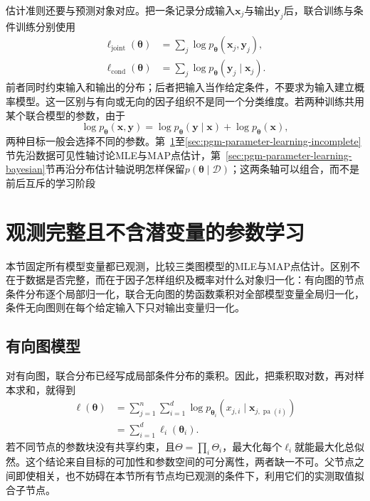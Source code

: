 估计准则还要与预测对象对应。把一条记录分成输入$\bm{x}_j$与输出$\bm{y}_j$后，联合训练与条件训练分别使用
\[
  \begin{aligned}
    \ell_{\mathrm{joint}}(\bm{\theta})
      &=\sum_j\log p_{\bm{\theta}}(\bm{x}_j,\bm{y}_j),\\
    \ell_{\mathrm{cond}}(\bm{\theta})
      &=\sum_j\log p_{\bm{\theta}}(\bm{y}_j\mid\bm{x}_j).
  \end{aligned}
\]
前者同时约束输入和输出的分布；后者把输入当作给定条件，不要求为输入建立概率模型。这一区别与有向或无向的因子组织不是同一个分类维度。若两种训练共用某个联合模型的参数，由于
\[
  \log p_{\bm{\theta}}(\bm{x},\bm{y})
  =\log p_{\bm{\theta}}(\bm{y}\mid\bm{x})
   +\log p_{\bm{\theta}}(\bm{x}),
\]
两种目标一般会选择不同的参数。第~\ref{sec:pgm-parameter-learning-complete}至\ref{sec:pgm-parameter-learning-incomplete}节先沿数据可见性轴讨论MLE与MAP点估计，第~\ref{sec:pgm-parameter-learning-bayesian}节再沿分布估计轴说明怎样保留$p(\bm{\theta}\mid\mathcal{D})$；这两条轴可以组合，而不是前后互斥的学习阶段

\section{观测完整且不含潜变量的参数学习}
\label{sec:pgm-parameter-learning-complete}

本节固定所有模型变量都已观测，比较三类图模型的MLE与MAP点估计。区别不在于数据是否完整，而在于因子怎样组织及概率对什么对象归一化：有向图的节点条件分布逐个局部归一化，联合无向图的势函数乘积对全部模型变量全局归一化，条件无向图则在每个给定输入下只对输出变量归一化。

\subsection{有向图模型}
\label{sec:pgm-parameter-learning-directed}

对有向图，联合分布已经写成局部条件分布的乘积。因此，把乘积取对数，再对样本求和，就得到
\begin{equation}
  \begin{aligned}
    \ell(\bm{\theta})
      &=\sum_{j=1}^n\sum_{i=1}^d
        \log p_{\bm{\theta}_i}
        (x_{j,i}\mid\bm{x}_{j,\operatorname{pa}(i)})\\
      &=\sum_{i=1}^d\ell_i(\bm{\theta}_i).
  \end{aligned}
  \label{eq:pgm-parameter-learning-dag-likelihood}
\end{equation}
若不同节点的参数块没有共享约束，且$\Theta=\prod_i\Theta_i$，最大化每个$\ell_i$就能最大化总似然。这个结论来自目标的可加性和参数空间的可分离性，两者缺一不可。父节点之间即使相关，也不妨碍在本节所有节点均已观测的条件下，利用它们的实测取值拟合子节点。

